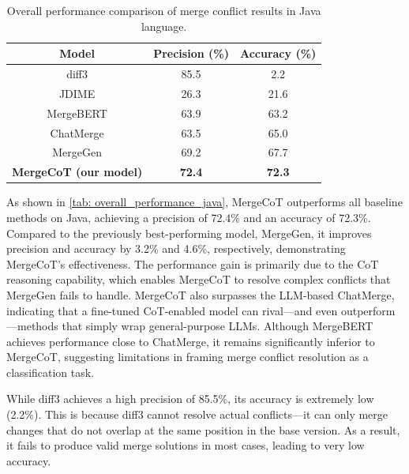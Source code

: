 \documentclass[sigconf,review,anonymous]{acmart}
\begin{document}
\begin{table}[ht]
\caption{Overall performance comparison of merge conflict results in Java language.}
\centering
\begin{tabular}{ccc}
\hline
\multicolumn{1}{c}{Model} & \multicolumn{1}{c}{Precision (\%)} & \multicolumn{1}{c}{Accuracy (\%)} \\ \hline
diff3                            & 85.5                               & 2.2                               \\
JDIME                            & 26.3                               & 21.6                              \\
MergeBERT                        & 63.9                               & 63.2                              \\
ChatMerge                        & 63.5                               & 65.0                              \\
MergeGen                         & 69.2                               & 67.7                              \\ \hline
\textbf{MergeCoT (our model)}    & \textbf{72.4}                      & \textbf{72.3}                     \\ \hline
\end{tabular}
\label{tab: overall_performance_java}
\end{table}


As shown in \autoref{tab: overall_performance_java}, MergeCoT outperforms all baseline methods on Java, achieving a precision of 72.4\% and an accuracy of 72.3\%. 
Compared to the previously best-performing model, MergeGen, it improves precision and accuracy by 3.2\% and 4.6\%, respectively, demonstrating MergeCoT's effectiveness. 
The performance gain is primarily due to the CoT reasoning capability, which enables MergeCoT to resolve complex conflicts that MergeGen fails to handle.
MergeCoT also surpasses the LLM-based ChatMerge, indicating that a fine-tuned CoT-enabled model can rival—and even outperform—methods that simply wrap general-purpose LLMs. Although MergeBERT achieves performance close to ChatMerge, it remains significantly inferior to MergeCoT, suggesting limitations in framing merge conflict resolution as a classification task.

While diff3 achieves a high precision of 85.5\%, its accuracy is extremely low (2.2\%). This is because diff3 cannot resolve actual conflicts—it can only merge changes that do not overlap at the same position in the base version. As a result, it fails to produce valid merge solutions in most cases, leading to very low accuracy.
\end{document}
